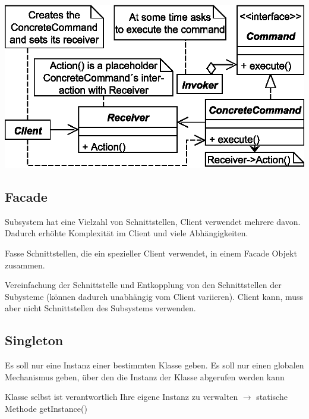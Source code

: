 \documentclass[a4paper,fontsize=9pt, DIV=calc]{scrartcl}
\begin{document}
\begin{multicols}{2}
\begin{center}
	\includegraphics[width=0.85\columnwidth]{./new/command}
\end{center}

\begin{multicols}{2}
\subsection{Facade}
\begin{description}[leftmargin=*]\itemsep-2mm
\item[Motivation / Problem] Subsystem hat eine Vielzahl von Schnittstellen, Client verwendet mehrere davon. Dadurch erhöhte Komplexität im Client und viele Abhängigkeiten. 
\item[Lösung] Fasse Schnittstellen, die ein spezieller Client verwendet, in einem Facade Objekt zusammen.
\item[Konsequenzen] Vereinfachung der Schnittstelle und Entkopplung von den Schnittstellen der Subysteme (können dadurch unabhängig vom Client variieren). Client kann, muss aber nicht Schnittstellen des Subsystems verwenden. 
\end{description}
\end{multicols}

\begin{minipage}{0.29\linewidth}
\subsection{Singleton}
\begin{description}[leftmargin=*]
\item[Problem] Es soll nur eine Instanz einer bestimmten Klasse geben. Es soll nur einen globalen Mechanismus geben, über den die Instanz der Klasse abgerufen werden kann
\item[Lösung] Klasse selbst ist verantwortlich Ihre eigene Instanz zu verwalten $\rightarrow$ statische Methode getInstance()
\end{description}


\end{minipage}
\end{multicols}
\end{document}
